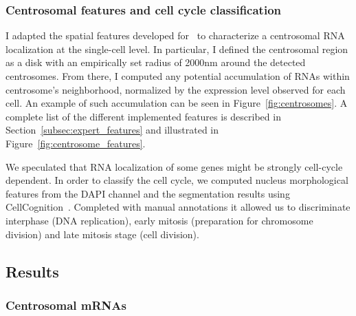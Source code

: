 \subsubsection{Centrosomal features and cell cycle classification}

I adapted the spatial features developed for~\cite{CHOUAIB_2020} to characterize a centrosomal \ac{RNA} localization at the single-cell level.
In particular, I defined the centrosomal region as a disk with an empirically set radius of 2000nm around the detected centrosomes.
From there, I  computed any potential accumulation of \ac{RNA}s within centrosome's neighborhood, normalized by the expression level observed for each cell.
An example of such accumulation can be seen in Figure~\ref{fig:centrosomes}.
A complete list of the different implemented features is described in Section~\ref{subsec:expert_features} and illustrated in Figure~\ref{fig:centrosome_features}.

We speculated that RNA localization of some genes might be strongly cell-cycle dependent.
In order to classify the cell cycle, we computed nucleus morphological features from the DAPI channel and the segmentation results using CellCognition~\cite{held_cellcognition_2010}.
Completed with manual annotations it allowed us to discriminate interphase (DNA replication), early mitosis (preparation for chromosome division) and late mitosis stage (cell division).

\subsection{Results}
\label{subsec:results_centrosomal}

\subsubsection{Centrosomal mRNAs}

